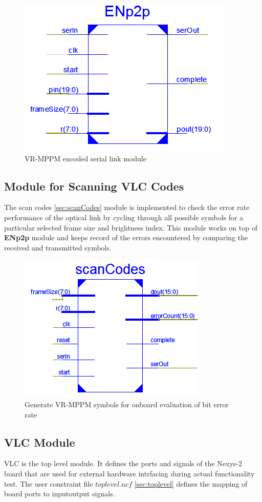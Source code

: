 \begin{figure}[!htbp]
	\centering
	\includegraphics[width=.5\textwidth]{./Figures/ENp2p.png}
	\caption{VR-MPPM encoded serial link module}
	\label{fig:ENp2p}
\end{figure}

\subsection{Module for Scanning VLC Codes}
The scan codes \ref{sec:scanCodes} module is implemented to check the error rate performance of the optical link by cycling through all possible symbols for a particular selected frame size and brightness index. This module works on top of \textbf{ENp2p} module and keeps record of the errors encountered by comparing the received and transmitted symbols.

\begin{figure}
	\centering
	\includegraphics[width=.5\textwidth]{./Figures/scanCodes.png}
	\caption[Module for generating scan symbols]{Generate VR-MPPM symbols for onboard evaluation of bit error rate}
	\label{fig:scanCodes}
\end{figure}

\subsection{VLC Module}
VLC is the top level module. It defines the ports and signals of the Nexys-2 board that are used for external hardware intrfacing during actual functionality test. The user constraint file $toplevel.ucf$ \ref{sec:toplevel} defines the mapping of board ports to input\/output  signals.


